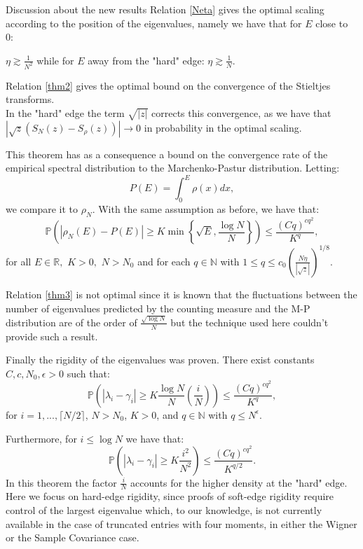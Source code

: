 \documentclass[11pt, a4paper, oneside]{book}
\numberwithin{equation}{chapter}
\begin{document}
\begin{section}{Discussion about the new results}
Relation \eqref{Neta} gives the optimal scaling according to the position of the eigenvalues, namely we have that for $ E $ close to $0:$  

$\eta \gtrsim \frac{1}{N^2} $ while for $E$ away from the "hard" edge: $ \eta \gtrsim \frac{1}{N} $.

Relation \eqref{thm2} gives the optimal bound on the convergence of the Stieltjes transforms. \\ In the "hard" edge the term $\sqrt{|z|}$ corrects this convergence, as we have that $|\sqrt{z} ( S_N (z) - S_{\rho}(z)) | \to 0$ in probability in the optimal scaling.

This theorem has as a consequence a bound on the convergence rate of the empirical spectral distribution to the Marchenko-Pastur distribution. Letting:
\[
P(E) = \int_0^E \rho(x) dx,
\]
we compare it to $\rho_N.$ With the same assumption as before, we have that:
%
\begin{equation} \label{thm3}
\mathbb{P} \left ( \left |\rho_N(E) - P(E)  \right | \geq K \min\left \{\sqrt{E},\frac{\log N}{N}\right \} \right ) \leq \frac{(Cq)^{cq^2}}{K^q},
\end{equation}
for all $E \in \mathbb{R},$ $K>0,$ $N>N_0$ and for each $q \in \mathbb{N}$ with $1 \leq q \leq c_0 \left (\frac{N\eta}{|\sqrt{z}|} \right )^{1/8}.$

Relation \eqref{thm3} is not optimal since it is known that the fluctuations between the number of eigenvalues predicted by the counting measure and the M-P distribution are of the order of $\frac{\sqrt{\log N}}{N}$ but the technique used here couldn't provide such a result.

Finally the rigidity of the eigenvalues was proven. There exist constants $C,c,N_0, \epsilon>0$ such that:
%
\begin{equation} \label{rigiditybulk}\mathbb{P} \left ( | \lambda_i  - \gamma_i | \geq K \frac{ \log N}{N} \left ( \frac{i}{N}  \right )\right) \leq \frac{(Cq)^{cq^2}}{K^q},\end{equation}
for $i=1,...,\lceil N/2 \rceil$, $N>N_0$, $K>0$, and $q \in \mathbb{N}$ with $q\leq N^\epsilon.$

Furthermore, for $i \leq \log N$ we have that:
\begin{equation} \label{rigidityedge}\mathbb{P} \left ( | \lambda_i  - \gamma_i | \geq K \frac{ i^2}{N^2}\right) \leq \frac{(Cq)^{cq^2}}{K^{q/2}}. \end{equation}
%
In this theorem the factor $\frac{i}{N}$ accounts for the higher density at the "hard" edge. Here we focus on hard-edge rigidity, since proofs of soft-edge rigidity require control of the largest eigenvalue which, to our knowledge, is not currently available in the case of truncated entries with four moments, in either the Wigner or the Sample Covariance case.


\end{section}
\end{document}
